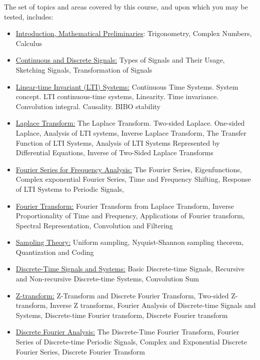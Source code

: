 \documentclass[12pt,nohyper,nobib,xcolor=dvipsnames,svgnames,x11names]{tufte-book}
\begin{document}
The set of topics and areas covered by this course, and upon which you may be tested, includes:
{
\begin{itemize}
	\item \color{forestgreen} \underline{Introduction, Mathematical Preliminaries}: Trigonometry, Complex Numbers, Calculus
 
    \item \color{darkrose} \underline{Continuous and Discrete Signals:} Types of Signals and Their Usage, Sketching Signals, Transformation of Signals
    
    \item  \color{forestgreen} \underline{Linear-time Invariant (LTI) Systems:} Continuous Time Systems. System concept. LTI continuous-time systems, Linearity. Time invariance. Convolution integral. Causality. BIBO stability
    
    \item   \color{darkrose} \underline{Laplace Transform:} The Laplace Transform. Two-sided Laplace. One-sided Laplace, Analysis of LTI systems, Inverse Laplace Transform, The Transfer Function of LTI Systems, Analysis of LTI Systems Represented by Differential Equations, Inverse of Two-Sided Laplace Transforms
    
    \item  \color{forestgreen} \underline{Fourier Series for Frequency Analysis:} The Fourier Series, Eigenfunctions, Complex exponential Fourier Series, Time and Frequency Shifting, Response of LTI Systems to Periodic Signals, 


    \item  \color{darkrose} \underline{Fourier Transform:} Fourier Transform from Laplace Transform, Inverse Proportionality of Time and Frequency, Applications of Fourier transform, Spectral Representation, Convolution and Filtering
    
    \item \color{forestgreen} \underline{Sampling Theory:} Uniform sampling, Nyquist-Shannon sampling theorem, Quantization and Coding
    
    \item   \color{darkrose}  \underline{Discrete-Time Signals and Systems:} Basic Discrete-time Signals, Recursive and Non-recursive Discrete-time Systems, Convolution Sum
    
    \item  \color{forestgreen} \underline{Z-transform:} Z-Transform and Discrete Fourier Transform, Two-sided Z-transform, Inverse Z transforms, Fourier Analysis of Discrete-time Signals and Systems, Discrete-time Fourier transform, Discrete Fourier transform
    
    \item  \color{darkrose} \underline{Discrete Fourier Analysis:} The Discrete-Time Fourier Transform, Fourier Series of Discrete-time Periodic Signals, Complex and Exponential Discrete Fourier Series, Discrete Fourier Transform
   
\end{itemize}
}
\end{document}
